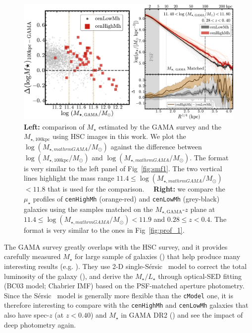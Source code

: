 \documentclass{emulateapj}
\def\ser{{S\'{e}rsic\ }}
\def\rbcg{\texttt{cenHighMh}}
\def\nbcg{\texttt{cenLowMh}}
\def\mstar{{$M_{\star}$}}
\def\mtot{{$M_{\star,100\mathrm{kpc}}$}}
\def\mgama{{$M_{\star,\mathrm{GAMA}}$}}
\def\logmtot{{$\log (M_{\star,100\mathrm{kpc}}/M_{\odot})$}}
\def\logmgama{{$\log (M_{\star,mathrm{GAMA}}/M_{\odot})$}}
\def\m2l{{$M_{\star}/L_{\star}$}}
\def\mden{{$\mu_{\star}$}}
\begin{document}
\begin{CJK*}{UTF8}{gbsn}
\begin{figure}[bt!]
    \centering
    \includegraphics[width=\textwidth]{fig/redbcg_prof_gama_new}
    \caption{
        \textbf{Left:} comparison of \mstar{} estimated by the GAMA survey and 
        the \mtot{} using HSC images in this work. 
        We plot the \logmgama{} against the difference between \logmtot{} and \logmgama{}. 
        The format is very similar to the left panel of Fig~\ref{fig:smf1}. 
        The two vertical lines highlight the mass range $11.4 \leq$\logmgama{}$<11.8$ 
        that is used for the comparison.~~
        \textbf{Right:} we compare the \mden{} profiles of \rbcg{} (orange-red) and 
        \nbcg{} (grey-black) galaxies using the samples matched on the 
        \mgama{}-$z$ plane at $11.4 \leq$\logmgama{}$<11.9$ and $0.28 \leq z < 0.4$. 
        The format is very similar to the ones in Fig~\ref{fig:prof_1}.}
    \label{fig:gama}
\end{figure}

    The GAMA survey greatly overlaps with the HSC survey, and it provides carefully 
    measured \mstar{} for large sample of galaxies (\citealt{Taylor2011}) that help 
    produce many interesting results (e.g. \citealt{Bauer2013, Ferreras2017}).
    They use 2-D single-\ser{} model to correct the total luminosity of the galaxy 
    (\citealt{Kelvin2012}), and derive the \m2l{} through optical-SED fitting 
    (BC03 model; Chabrier IMF) based on the PSF-matched aperture photometry. 
    Since the \ser{} model is generally more flexible than the \texttt{cModel} one, 
    it is therefore interesting to compare with the \rbcg{} and \nbcg{} galaxies 
    that also have spec-$z$ (at $z < 0.40$) and \mstar{} in GAMA DR2 
    (\citealt{Liske2015}) and see the impact of deep photometry again. 
    

\end{CJK*}
\end{document}
